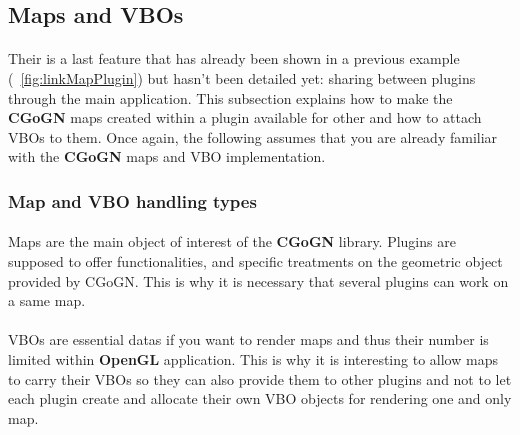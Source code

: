 \documentclass[a4paper]{scrreprt}
\begin{document}
\subsection{Maps and VBOs}
	\paragraph{}
	Their is a last feature that has already been shown in a previous example
	(~\ref{fig:linkMapPlugin}) but hasn't been detailed yet: sharing between
	plugins through the main application. This subsection explains how to make the
	\textbf{CGoGN} maps created within a plugin available for other and how to
	attach VBOs to them. Once again, the following assumes that you are already
	familiar with the \textbf{CGoGN} maps and VBO implementation.
	
	\subsubsection{Map and VBO handling types}
	\paragraph{}
	Maps are the main object of interest of the \textbf{CGoGN} library. Plugins are
	supposed to offer functionalities, and specific treatments on the geometric
	object provided by CGoGN. This is why it is necessary that several plugins can
	work on a same map.
	
	\paragraph{}
	VBOs are essential datas if you want to render maps and thus their number is
	limited within \textbf{OpenGL} application. This is why it is interesting to
	allow maps to carry their VBOs so they can also provide them to other plugins
	and not to let each plugin create and allocate their own VBO objects for
	rendering one and only map.
	
\end{document}
